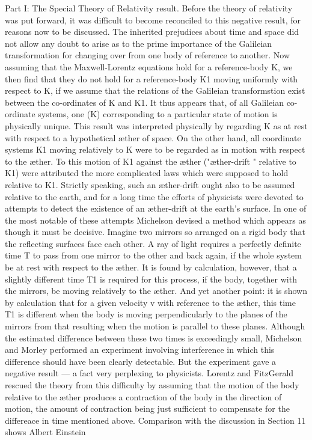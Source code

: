 \documentclass{article}
\begin{document}
Part I: The Special Theory of Relativity
result. Before the theory of relativity was put forward, it was difficult to become reconciled
to this negative result, for reasons now to be discussed. The inherited prejudices about time
and space did not allow any doubt to arise as to the prime importance of the Galileian
transformation for changing over from one body of reference to another. Now assuming that
the Maxwell-Lorentz equations hold for a reference-body K, we then find that they do not
hold for a reference-body K1 moving uniformly with respect to K, if we assume that the
relations of the Galileian transformstion exist between the co-ordinates of K and K1. It thus
appears that, of all Galileian co-ordinate systems, one (K) corresponding to a particular state
of motion is physically unique. This result was interpreted physically by regarding K as at
rest with respect to a hypothetical æther of space. On the other hand, all coordinate systems
K1 moving relatively to K were to be regarded as in motion with respect to the æther. To
this motion of K1 against the æther ("æther-drift " relative to K1) were attributed the more
complicated laws which were supposed to hold relative to K1. Strictly speaking, such an
æther-drift ought also to be assumed relative to the earth, and for a long time the efforts of
physicists were devoted to attempts to detect the existence of an æther-drift at the earth's
surface.
In one of the most notable of these attempts Michelson devised a method which appears
as though it must be decisive. Imagine two mirrors so arranged on a rigid body that the
reflecting surfaces face each other. A ray of light requires a perfectly definite time T to pass
from one mirror to the other and back again, if the whole system be at rest with respect to
the æther. It is found by calculation, however, that a slightly different time T1 is required for
this process, if the body, together with the mirrors, be moving relatively to the æther. And
yet another point: it is shown by calculation that for a given velocity v with reference to the
æther, this time T1 is different when the body is moving perpendicularly to the planes of the
mirrors from that resulting when the motion is parallel to these planes. Although the
estimated difference between these two times is exceedingly small, Michelson and Morley
performed an experiment involving interference in which this difference should have been
clearly detectable. But the experiment gave a negative result — a fact very perplexing to
physicists. Lorentz and FitzGerald rescued the theory from this difficulty by assuming that
the motion of the body relative to the æther produces a contraction of the body in the
direction of motion, the amount of contraction being just sufficient to compensate for the
differeace in time mentioned above. Comparison with the discussion in Section 11 shows
Albert Einstein
\end{document}
